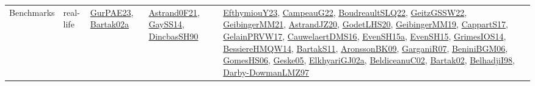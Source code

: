 {\begin{longtable}{lp{3cm}>{\raggedright}p{6cm}>{\raggedright}p{6cm}p{8cm}}
Benchmarks & real-life & \href{articles/GurPAE23.pdf}{GurPAE23}\cite{GurPAE23}, \href{papers/Bartak02a.pdf}{Bartak02a}\cite{Bartak02a} & \href{papers/Astrand0F21.pdf}{Astrand0F21}\cite{Astrand0F21}, \href{papers/GaySS14.pdf}{GaySS14}\cite{GaySS14}, \href{articles/DincbasSH90.pdf}{DincbasSH90}\cite{DincbasSH90} & \href{papers/EfthymiouY23.pdf}{EfthymiouY23}\cite{EfthymiouY23}, \href{articles/CampeauG22.pdf}{CampeauG22}\cite{CampeauG22}, \href{papers/BoudreaultSLQ22.pdf}{BoudreaultSLQ22}\cite{BoudreaultSLQ22}, \href{papers/GeitzGSSW22.pdf}{GeitzGSSW22}\cite{GeitzGSSW22}, \href{papers/GeibingerMM21.pdf}{GeibingerMM21}\cite{GeibingerMM21}, \href{articles/AstrandJZ20.pdf}{AstrandJZ20}\cite{AstrandJZ20}, \href{papers/GodetLHS20.pdf}{GodetLHS20}\cite{GodetLHS20}, \href{papers/GeibingerMM19.pdf}{GeibingerMM19}\cite{GeibingerMM19}, \href{papers/CappartS17.pdf}{CappartS17}\cite{CappartS17}, \href{papers/GelainPRVW17.pdf}{GelainPRVW17}\cite{GelainPRVW17}, \href{papers/CauwelaertDMS16.pdf}{CauwelaertDMS16}\cite{CauwelaertDMS16}, \href{articles/EvenSH15a.pdf}{EvenSH15a}\cite{EvenSH15a}, \href{papers/EvenSH15.pdf}{EvenSH15}\cite{EvenSH15}, \href{articles/GrimesIOS14.pdf}{GrimesIOS14}\cite{GrimesIOS14}, \href{papers/BessiereHMQW14.pdf}{BessiereHMQW14}\cite{BessiereHMQW14}, \href{articles/BartakS11.pdf}{BartakS11}\cite{BartakS11}, \href{papers/AronssonBK09.pdf}{AronssonBK09}\cite{AronssonBK09}, \href{papers/GarganiR07.pdf}{GarganiR07}\cite{GarganiR07}, \href{papers/BeniniBGM06.pdf}{BeniniBGM06}\cite{BeniniBGM06}, \href{papers/GomesHS06.pdf}{GomesHS06}\cite{GomesHS06}, \href{papers/Geske05.pdf}{Geske05}\cite{Geske05}, \href{papers/ElkhyariGJ02a.pdf}{ElkhyariGJ02a}\cite{ElkhyariGJ02a}, \href{papers/BeldiceanuC02.pdf}{BeldiceanuC02}\cite{BeldiceanuC02}, \href{papers/Bartak02.pdf}{Bartak02}\cite{Bartak02}, \href{articles/BelhadjiI98.pdf}{BelhadjiI98}\cite{BelhadjiI98}, \href{articles/Darby-DowmanLMZ97.pdf}{Darby-DowmanLMZ97}\cite{Darby-DowmanLMZ97}\\

\end{longtable}}
